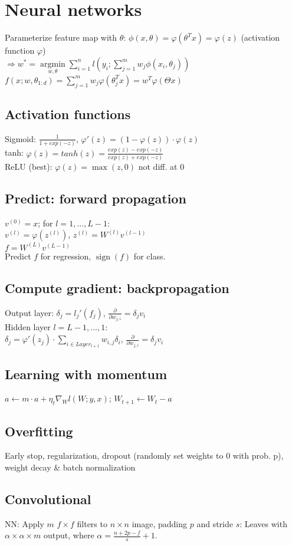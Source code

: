 \section*{Neural networks}
\noindent Parameterize feature map with $\theta$: $\phi(x,\theta) = \varphi(\theta^T x) = \varphi(z)$ (activation function $\varphi$)\\
$\Rightarrow w^* = \underset{w, \theta}{\operatorname{argmin}} \sum_{i=1}^n l(y_i; \sum_{j=1}^m w_j \phi(x_i, \theta_j))$\\
$f(x; w, \theta_{1:d}) = \sum_{j=1}^m w_j \varphi(\theta_j^T x) = w^T \varphi(\Theta x)$

\subsection*{Activation functions}
\noindent Sigmoid: $\frac{1}{1+exp(-z)}$,  $\varphi'(z) = (1 - \varphi(z))\cdot\varphi(z)$\\
tanh: $\varphi(z) = tanh(z) = \frac{exp(z)-exp(-z)}{exp(z)+exp(-z)}$\\
ReLU (best):  $\varphi(z) = \max(z,0)$  not diff. at $0$

\subsection*{Predict: forward propagation}
\noindent $v^{(0)} = x$; for $l = 1,...,L-1$: \\
$v^{(l)} = \varphi(z^{(l)})$, $z^{(l)} = W^{(l)}v^{(l-1)}$\\
$f = W^{(L)}v^{(L-1)}$\\
Predict $f$ for regression, $\operatorname{sign}(f)$ for class.

\subsection*{Compute gradient: backpropagation}
\noindent Output layer: 
$\delta_j = l_j'(f_j)$,
$\frac{\partial}{\partial w_{j,i}} = \delta_j v_i$\\
Hidden layer $l=L-1,...,1$:\\
$\delta_j = \varphi'(z_j) \cdot \sum_{i\in Layer_{l+1}} w_{i,j}\delta_i$,
$\frac{\partial}{\partial w_{j,i}} = \delta_j v_i$

\subsection*{Learning with momentum}
\noindent $a \leftarrow m \cdot a + \eta_t \nabla_W l(W;y,x)$; $W_{t+1} \leftarrow W_t - a$

\subsection*{Overfitting}
\noindent Early stop, regularization, dropout (randomly set weights to 0 with prob. p), weight decay \& batch normalization

\subsection*{Convolutional} 
\noindent NN: Apply $m$ $f\times f$ filters to $n\times n$ image,
padding $p$ and stride $s$: Leaves with $\alpha \times \alpha \times m$ output,
where $\alpha = \frac{n+2p-f}{s} + 1$.
